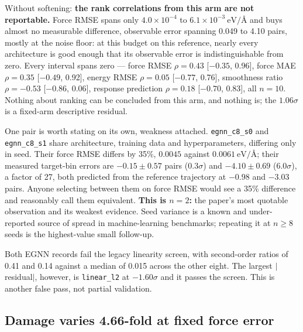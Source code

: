 \documentclass[aip,jcp,reprint,amsmath,amssymb,floatfix]{revtex4-2}
\newcommand{\eVA}{\ensuremath{\mathrm{eV}/\text{\AA}}}
\begin{document}
Without softening: \textbf{the rank correlations from this arm
are not reportable.} Force RMSE spans only $4.0\times10^{-4}$ to
$6.1\times10^{-3}~\eVA$ and buys almost no measurable
difference, observable error spanning 0.049 to 4.10 pairs, mostly at the
noise floor: at this budget on this reference,
nearly every architecture is good enough that its observable error is
indistinguishable from zero. Every interval spans zero ---
force RMSE $\rho = 0.43$ [$-0.35$, 0.96], force MAE $\rho = 0.35$ [$-0.49$,
0.92], energy RMSE $\rho = 0.05$ [$-0.77$, 0.76], smoothness ratio
$\rho = -0.53$ [$-0.86$, 0.06], response prediction $\rho = 0.18$ [$-0.70$,
0.83], all $n = 10$. Nothing about ranking can be concluded from this arm, and
nothing is; the $1.06\sigma$ is a fixed-arm descriptive residual.

One pair is worth stating on its own, weakness attached.
\texttt{egnn\_c8\_s0} and \texttt{egnn\_c8\_s1} share architecture,
training data and hyperparameters, differing only in seed.
Their force RMSE differs by 35\%, $0.0045$ against
$0.0061~\eVA$; their measured target-bin errors are $-0.15 \pm 0.57$ pairs
($0.3\sigma$) and $-4.10 \pm 0.69$ ($6.0\sigma$), a factor of 27, both
predicted from the reference trajectory at $-0.98$ and $-3.03$ pairs. Anyone
selecting between them on force
RMSE would see a 35\% difference and reasonably call them equivalent.
\textbf{This is $n = 2$:} the paper's most quotable observation and
its weakest evidence. Seed
variance is a known and under-reported source of spread in machine-learning
benchmarks\cite{Bouthillier2021, Pineau2021, Kapoor2024}; repeating it
at $n \ge 8$ seeds is the highest-value small follow-up.

Both EGNN records fail the legacy linearity screen, with second-order ratios of
0.41 and 0.14 against a median of 0.015 across the other eight. The largest
$|$residual$|$, however, is \texttt{linear\_l2} at $-1.60\sigma$ and it passes
the screen. This is another false pass, not partial validation.

\subsection{Damage varies 4.66-fold at fixed force error}
\label{sec:width}
\end{document}
